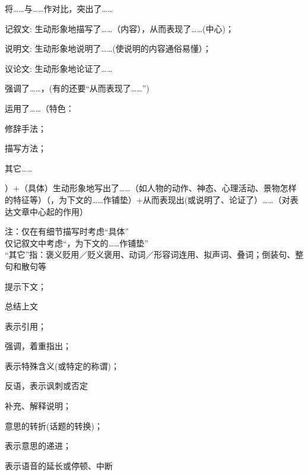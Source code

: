 将\ldots{}\ldots{}与\ldots{}\ldots{}作对比，突出了\ldots{}\ldots{}

\begin{asparadesc}
\item[记叙文:]生动形象地描写了\ldots{}\ldots{}（内容），从而表现了\ldots{}\ldots{}(中心)；\\
\item[说明文:]生动形象地说明了\ldots{}\ldots{}(使说明的内容通俗易懂）；\\
\item[议论文:]生动形象地论证了\ldots{}\ldots{}
\end{asparadesc}

强调了\ldots{}\ldots{}，(有的还要``从而表现了\ldots{}\ldots{}'')

运用了\ldots{}\ldots{}（特色：\begin{inparaenum}[(1)]\item 修辞手法；\item 描写方法；\item 其它\ldots{}\ldots{}\end{inparaenum}）+（具体）生动形象地写出了\ldots{}\ldots{}（如人物的动作、神态、心理活动、景物怎样的特征等）（，为下文的\ldots{}\ldots{}作铺垫）+从而表现出(或说明了、论证了）\ldots{}\ldots{}（对表达文章中心起的作用）\par
注：仅在有细节描写时考虑``具体''\\
仅记叙文中考虑``，为下文的\ldots{}\ldots{}作铺垫''\\
``其它''指：褒义贬用／贬义褒用、动词／形容词连用、拟声词、叠词；倒装句、整句和散句等
\begin{asparaenum}[(1)]
\item 提示下文；
\item 总结上文
\end{asparaenum}

\begin{asparaenum}[(1)]
\item 表示引用；
\item 强调，着重指出；
\item 表示特殊含义(或特定的称谓)；
\item 反语，表示讽刺或否定
\end{asparaenum}

\begin{asparaenum}[(1)]
\item 补充、解释说明；
\item 意思的转折(话题的转换)；
\item 表示意思的递进；
\item 表示语音的延长或停顿、中断
\end{asparaenum}

